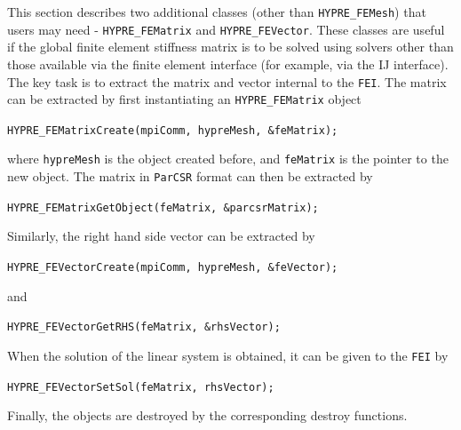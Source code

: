 This section describes two additional classes (other than {\tt HYPRE\_FEMesh})
that users may need - {\tt HYPRE\_FEMatrix} and {\tt HYPRE\_FEVector}. 
These classes are useful if the global finite element stiffness matrix is
to be solved using solvers other than those available via the finite element
interface (for example, via the IJ interface). The key task is to extract
the matrix and vector internal to the {\tt FEI}. The matrix can be extracted
by first instantiating an {\tt HYPRE\_FEMatrix} object
\begin{tabbing}
\hspace{0.5in} \= {\tt HYPRE\_FEMatrixCreate(mpiComm, hypreMesh, \&feMatrix);}
\end{tabbing}
where {\tt hypreMesh} is the object created before, and {\tt feMatrix} is 
the pointer to the new object.
The \hypre{} matrix in {\tt ParCSR} format can then be extracted by
\begin{tabbing}
\hspace{0.5in} \= {\tt HYPRE\_FEMatrixGetObject(feMatrix, \&parcsrMatrix);}
\end{tabbing}
Similarly, the right hand side vector can be extracted by
\begin{tabbing}
\hspace{0.5in} \= {\tt HYPRE\_FEVectorCreate(mpiComm, hypreMesh, \&feVector);}
\end{tabbing}
and
\begin{tabbing}
\hspace{0.5in} \= {\tt HYPRE\_FEVectorGetRHS(feMatrix, \&rhsVector);}
\end{tabbing}
When the solution of the linear system is obtained, it can be given
to the {\tt FEI} by
\begin{tabbing}
\hspace{0.5in} \= {\tt HYPRE\_FEVectorSetSol(feMatrix, rhsVector);}
\end{tabbing}
Finally, the objects are destroyed by the corresponding destroy functions.


